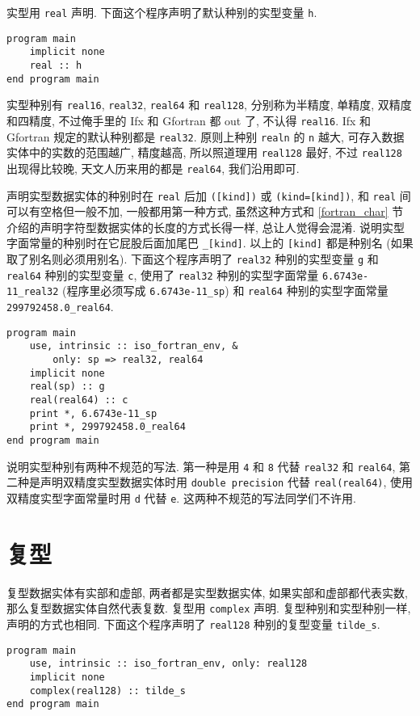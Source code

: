 实型用 \texttt{real} 声明. 下面这个程序声明了默认种别的实型变量 \texttt{h}.
\begin{lstlisting}
program main
    implicit none
    real :: h
end program main
\end{lstlisting}

实型种别有 \texttt{real16}, \texttt{real32}, \texttt{real64} 和 \texttt{real128}, 分别称为半精度, 单精度, 双精度和四精度, 不过俺手里的 Ifx 和 Gfortran 都 out 了, 不认得 \texttt{real16}. Ifx 和 Gfortran 规定的默认种别都是 \texttt{real32}. 原则上种别 \texttt{realn} 的 \texttt{n} 越大, 可存入数据实体中的实数的范围越广, 精度越高, 所以照道理用 \texttt{real128} 最好, 不过 \texttt{real128} 出现得比较晚, 天文人历来用的都是 \texttt{real64}, 我们沿用即可.

声明实型数据实体的种别时在 \texttt{real} 后加 \texttt{([kind])} 或 \texttt{(kind=[kind])}, 和 \texttt{real} 间可以有空格但一般不加, 一般都用第一种方式, 虽然这种方式和 \ref{fortran_char} 节介绍的声明字符型数据实体的长度的方式长得一样, 总让人觉得会混淆. 说明实型字面常量的种别时在它屁股后面加尾巴 \texttt{\_{}[kind]}. 以上的 \texttt{[kind]} 都是种别名 (如果取了别名则必须用别名). 下面这个程序声明了 \texttt{real32} 种别的实型变量 \texttt{g} 和 \texttt{real64} 种别的实型变量 \texttt{c}, 使用了 \texttt{real32} 种别的实型字面常量 \texttt{6.6743e-11\_{}real32} (程序里必须写成 \texttt{6.6743e-11\_{}sp}) 和 \texttt{real64} 种别的实型字面常量 \texttt{299792458.0\_{}real64}.
\begin{lstlisting}
program main
    use, intrinsic :: iso_fortran_env, &
        only: sp => real32, real64
    implicit none
    real(sp) :: g
    real(real64) :: c
    print *, 6.6743e-11_sp
    print *, 299792458.0_real64
end program main
\end{lstlisting}

说明实型种别有两种不规范的写法. 第一种是用 \texttt{4} 和 \texttt{8} 代替 \texttt{real32} 和 \texttt{real64}, 第二种是声明双精度实型数据实体时用 \texttt{double precision} 代替 \texttt{real(real64)}, 使用双精度实型字面常量时用 \texttt{d} 代替 \texttt{e}. 这两种不规范的写法同学们不许用.

\section{复型}

复型数据实体有实部和虚部, 两者都是实型数据实体, 如果实部和虚部都代表实数, 那么复型数据实体自然代表复数. 复型用 \texttt{complex} 声明. 复型种别和实型种别一样, 声明的方式也相同. 下面这个程序声明了 \texttt{real128} 种别的复型变量 \texttt{tilde\_{}s}.
\begin{lstlisting}
program main
    use, intrinsic :: iso_fortran_env, only: real128
    implicit none
    complex(real128) :: tilde_s
end program main
\end{lstlisting}

